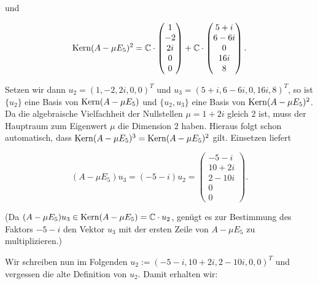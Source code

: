 \begin{beispiel}
	und
	
	\[
		\operatorname{Kern}(A - \mu E_5)^2 = \mathbb{C} \cdot \begin{pmatrix}
			1 \\ -2 \\ 2i \\ 0 \\ 0
		\end{pmatrix} + \mathbb{C} \cdot \begin{pmatrix}
			5+i \\ 6-6i \\ 0 \\ 16i \\ 8
		\end{pmatrix}.
	\]
	
	Setzen wir dann $u_2 = (1,-2,2i,0,0)^T$ und $u_3 = (5+i,6-6i,0,16i,8)^T$, so ist $\{u_2\}$ eine Basis von $\operatorname{Kern}(A- \mu E_5)$ und $\{u_2,u_3\}$ eine Basis von $\operatorname{Kern}(A-\mu E_5)^2$.
	Da die algebraische Vielfachheit der Nullstellen $\mu = 1+ 2i$ gleich $2$ ist, muss der Hauptraum zum Eigenwert $\mu$ die Dimension $2$ haben.
	Hieraus folgt schon automatisch, dass $\operatorname{Kern}(A-\mu E_5)^3 = \operatorname{Kern}(A - \mu E_5)^2$ gilt.
	Einsetzen liefert
	
	\[
		(A-\mu E_5) u_3 = (-5-i) u_2 = \begin{pmatrix}
			-5-i \\ 10 + 2i \\ 2 - 10i \\ 0 \\ 0
		\end{pmatrix}.
	\]
	
	(Da $(A-\mu E_5)u_3 \in \operatorname{Kern}(A-\mu E_5) = \mathbb{C} \cdot u_2$, genügt es zur Bestimmung des Faktors $-5-i$ den Vektor $u_3$ mit der ersten Zeile von $A - \mu E_5$ zu multiplizieren.)
	
	Wir schreiben nun im Folgenden $u_2 := (-5-i, 10+2i, 2-10i, 0, 0)^T$ und vergessen die alte Definition von $u_2$.
	Damit erhalten wir:
	

\end{beispiel}

